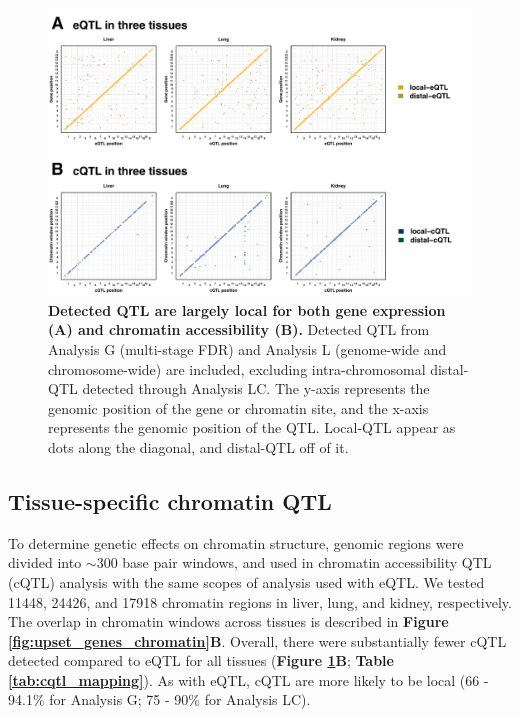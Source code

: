 \documentclass[9pt,twocolumn,twoside]{gsajnl}
\begin{document}
\begin{figure}[h]
\renewcommand{\familydefault}{\sfdefault}\normalfont
\centering
\includegraphics[width=\textwidth, trim={0in 0in 0in 0in}, clip]{figs/qtl_map_main.pdf}
\caption{\textbf{Detected QTL are largely local for both gene expression (A) and chromatin accessibility (B).} Detected QTL from Analysis G (multi-stage FDR) and Analysis L (genome-wide and chromosome-wide) are included, excluding intra-chromosomal distal-QTL detected through Analysis LC. The y-axis represents the genomic position of the gene or chromatin site, and the x-axis represents the genomic position of the QTL. Local-QTL appear as dots along the diagonal, and distal-QTL off of it.
\label{fig:grid_plot}}
\end{figure}

\subsection{Tissue-specific chromatin QTL}

To determine genetic effects on chromatin structure, genomic regions were divided into $\sim$300 base pair windows, and used in chromatin accessibility QTL (cQTL) analysis with the same scopes of analysis used with eQTL. We tested 11448, 24426, and 17918 chromatin regions in liver, lung, and kidney, respectively. The overlap in chromatin windows across tissues is described in \textbf{Figure \ref{fig:upset_genes_chromatin}B}. Overall, there were substantially fewer cQTL detected compared to eQTL for all tissues (\textbf{Figure \ref{fig:grid_plot}B}; \textbf{Table \ref{tab:cqtl_mapping}}). As with eQTL, cQTL are more likely to be local (66 - 94.1\% for Analysis G; 75 - 90\% for Analysis LC).
\end{document}
